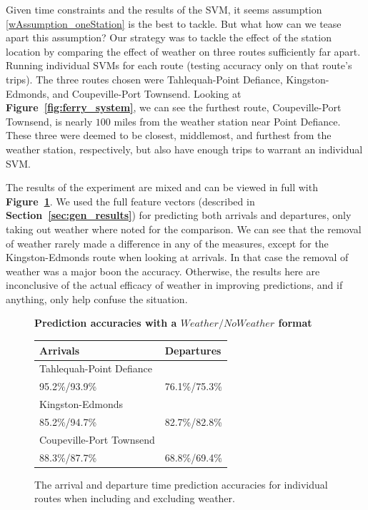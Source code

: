 \documentclass[11pt]{article} %
\begin{document}
Given time constraints and the results of the SVM, it seems assumption 
\ref{wAssumption_oneStation} is the best to tackle. But what how can we tease
apart this assumption? Our strategy was to tackle the effect of the station
location by comparing the effect of weather on three routes sufficiently far apart.
Running individual SVMs for each route (testing accuracy only on that route's 
trips). The three routes chosen were Tahlequah-Point Defiance, Kingston-Edmonds,
and Coupeville-Port Townsend. Looking at \textbf{Figure~\ref{fig:ferry_system}},
we can see the furthest route, Coupeville-Port Townsend, is nearly $100$ miles
from the weather station near Point Defiance. These three were deemed to be 
closest, middlemost, and furthest from the weather station, respectively, but also 
have enough trips to warrant an individual SVM. 

The results of the experiment are mixed and can be viewed in full with 
\textbf{Figure~\ref{fig:weatherExperiment}}. We used the full feature vectors 
(described in \textbf{Section~\ref{sec:gen_results}}) for 
predicting both arrivals and departures, only taking out weather where noted
for the comparison. We can see that the removal of weather rarely made a difference
in any of the measures, except for the Kingston-Edmonds route when looking at 
arrivals. In that case the removal of weather was a major boon the accuracy. 
Otherwise, the results here are inconclusive of the actual efficacy of weather
in improving predictions, and if anything, only help confuse the situation.

\begin{figure}
    \centering
    \textbf{Prediction accuracies with a $Weather/NoWeather$ format}

    \begin{tabular}{ll}
        \textbf{Arrivals} & \textbf{Departures}\\
        \hline
        Tahlequah-Point Defiance    & \\
        95.2\%/93.9\% & 76.1\%/75.3\% \\
        Kingston-Edmonds    & \\
        85.2\%/94.7\% & 82.7\%/82.8\% \\
        Coupeville-Port Townsend     & \\
        88.3\%/87.7\% & 68.8\%/69.4\% 
    \end{tabular}
    \caption{The arrival and departure time prediction accuracies for individual 
        routes when including and excluding weather.}
    \label{fig:weatherExperiment}
\end{figure}
\end{document}
